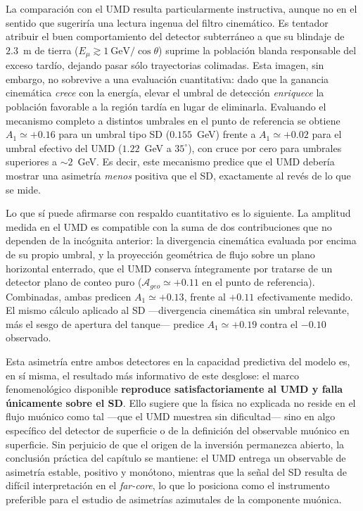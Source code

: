 La comparación con el UMD resulta particularmente instructiva, aunque no en el sentido que sugeriría una lectura ingenua del filtro cinemático. Es tentador atribuir el buen comportamiento del detector subterráneo a que su blindaje de $2.3$~m de tierra ($E_\mu \gtrsim 1~\mathrm{GeV}/\cos\theta$) suprime la población blanda responsable del exceso tardío, dejando pasar sólo trayectorias colimadas. Esta imagen, sin embargo, no sobrevive a una evaluación cuantitativa: dado que la ganancia cinemática \textit{crece} con la energía, elevar el umbral de detección \textit{enriquece} la población favorable a la región tardía en lugar de eliminarla. Evaluando el mecanismo completo a distintos umbrales en el punto de referencia se obtiene $A_1 \simeq +0.16$ para un umbral tipo SD ($0.155$~GeV) frente a $A_1 \simeq +0.02$ para el umbral efectivo del UMD ($1.22$~GeV a $35^\circ$), con cruce por cero para umbrales superiores a $\sim 2$~GeV. Es decir, este mecanismo predice que el UMD debería mostrar una asimetría \textit{menos} positiva que el SD, exactamente al revés de lo que se mide.

Lo que sí puede afirmarse con respaldo cuantitativo es lo siguiente. La amplitud medida en el UMD es compatible con la suma de dos contribuciones que no dependen de la incógnita anterior: la divergencia cinemática evaluada por encima de su propio umbral, y la proyección geométrica de flujo sobre un plano horizontal enterrado, que el UMD conserva íntegramente por tratarse de un detector plano de conteo puro ($\mathcal{A}_{geo} \simeq +0.11$ en el punto de referencia). Combinadas, ambas predicen $A_1 \simeq +0.13$, frente al $+0.11$ efectivamente medido. El mismo cálculo aplicado al SD —divergencia cinemática sin umbral relevante, más el sesgo de apertura del tanque— predice $A_1 \simeq +0.19$ contra el $-0.10$ observado.

Esta asimetría entre ambos detectores en la capacidad predictiva del modelo es, en sí misma, el resultado más informativo de este desglose: el marco fenomenológico disponible \textbf{reproduce satisfactoriamente al UMD y falla únicamente sobre el SD}. Ello sugiere que la física no explicada no reside en el flujo muónico como tal —que el UMD muestrea sin dificultad— sino en algo específico del detector de superficie o de la definición del observable muónico en superficie. Sin perjuicio de que el origen de la inversión permanezca abierto, la conclusión práctica del capítulo se mantiene: el UMD entrega un observable de asimetría estable, positivo y monótono, mientras que la señal del SD resulta de difícil interpretación en el \textit{far-core}, lo que lo posiciona como el instrumento preferible para el estudio de asimetrías azimutales de la componente muónica.


